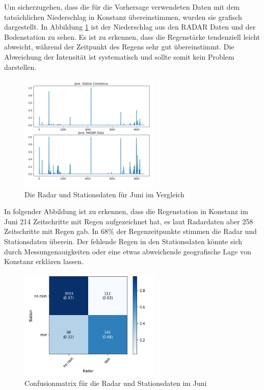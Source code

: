 \noindent
Um sicherzugehen, dass die für die Vorhersage verwendeten Daten mit dem tatsächlichen Niederschlag in Konstanz übereinstimmen, wurden sie grafisch dargestellt. 
In Abbildung \ref{fig:radar_station_daten_vergleich} ist der Niederschlag aus den RADAR Daten und der Bodenstation zu sehen. 
Es ist zu erkennen, dass die Regenstärke tendenziell leicht abweicht, während der Zeitpunkt des Regens sehr gut übereinstimmt.  
Die Abweichung der Intensität ist systematisch und sollte somit kein Problem darstellen. 
\begin{figure}[H]
    \centering
    \includegraphics[width=0.6\textwidth,angle=0]{abb/radar_station_daten_vergleich_June}
    \caption[Radar und Stationsdaten]{Die Radar und Stationsdaten für Juni im Vergleich}
   \label{fig:radar_station_daten_vergleich}
\end{figure}

\noindent
In folgender Abbildung ist zu erkennen, dass die Regenstation in Konstanz im Juni 214 Zeitschritte mit Regen aufgezeichnet hat, es laut Radardaten aber 258 Zeitschritte mit Regen gab.
In 68\% der Regenzeitpunkte stimmen die Radar und Stationsdaten überein. 
Der fehlende Regen in den Stationsdaten könnte sich durch Messungenauigkeiten oder eine etwas abweichende geografische Lage von Konstanz erklären lassen.
\begin{figure}[H]
    \centering
    \includegraphics[width=0.6\textwidth,angle=0]{abb/confusion_matrix_stationdata_radardata}
    \caption[Confusion Matrix mit Radar und Stationsdaten]{Confusionmatrix für die Radar und Stationsdaten im Juni}
   \label{fig:confusion_radar_station}
\end{figure}
 